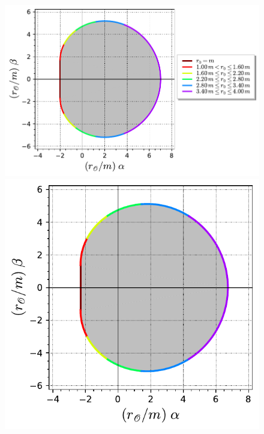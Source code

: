 \begin{figure}
\begin{center}
\includegraphics[height=0.28\textheight]{gik_shadow_a1_th90.pdf} \\[1ex]
\includegraphics[height=0.28\textheight]{gik_shadow_a1_th60.pdf}\qquad

\end{center}
\end{figure}
